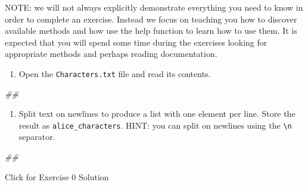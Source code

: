 \documentclass[
]{book}
\newenvironment{Shaded}{\begin{snugshade}}{\end{snugshade}}
\newcommand{\CommentTok}[1]{\textcolor[rgb]{0.56,0.35,0.01}{\textit{#1}}}
\providecommand{\tightlist}{%
  \setlength{\itemsep}{0pt}\setlength{\parskip}{0pt}}
\begin{document}
NOTE: we will not always explicitly demonstrate everything you need to know in order to complete an exercise. Instead we focus on teaching you how to discover available methods and how use the help function to learn how to use them. It is expected that you will spend some time during the exercises looking for appropriate methods and perhaps reading documentation.

\begin{enumerate}
\def\labelenumi{\arabic{enumi}.}
\tightlist
\item
  Open the \texttt{Characters.txt} file and read its contents.
\end{enumerate}

\begin{Shaded}
\begin{Highlighting}[]
\CommentTok{\#\#}
\end{Highlighting}
\end{Shaded}

\begin{enumerate}
\def\labelenumi{\arabic{enumi}.}
\setcounter{enumi}{1}
\tightlist
\item
  Split text on newlines to produce a list with one element per line. Store the result as \texttt{alice\_characters}. HINT: you can split on newlines using the \texttt{\textbackslash{}n} separator.
\end{enumerate}

\begin{Shaded}
\begin{Highlighting}[]
\CommentTok{\#\#}
\end{Highlighting}
\end{Shaded}

{Click for Exercise 0 Solution}
\end{document}

